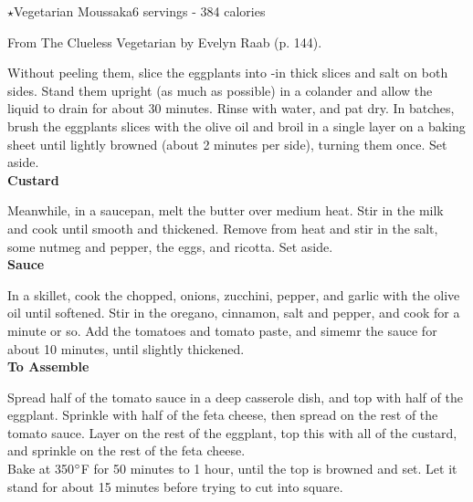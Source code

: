 \begin{recipe}{$\star$Vegetarian Moussaka}{6 servings - 384 calories}{}

\freeform From {\normalfont The Clueless Vegetarian} by Evelyn Raab (p. 144).


Without peeling them, slice the eggplants into -in thick slices and salt on both sides. Stand them upright (as much as possible) in a colander and allow the liquid to drain for about 30 minutes. Rinse with water, and pat dry. In batches, brush the eggplants slices with the olive oil and broil in a single layer on a baking sheet until lightly browned (about 2 minutes per side), turning them once. Set aside.\\

\textbf{Custard}

Meanwhile, in a saucepan, melt the butter over medium heat. Stir in the milk and cook until smooth and thickened. Remove from heat and stir in the salt, some nutmeg and pepper, the eggs, and ricotta. Set aside.\\

\textbf{Sauce}

In a skillet, cook the chopped, onions, zucchini, pepper, and garlic with the olive oil until softened. Stir in the oregano, cinnamon, salt and pepper, and cook for a minute or so. Add the tomatoes and tomato paste, and simemr the sauce for about 10 minutes, until slightly thickened.\\

\textbf{To Assemble}

Spread half of the tomato sauce in a deep casserole dish, and top with half of the eggplant. Sprinkle with half of the feta cheese, then spread on the rest of the tomato sauce. Layer on the rest of the eggplant, top this with all of the custard, and sprinkle on the rest of the feta cheese.\\

Bake at 350$\degree$F for 50 minutes to 1 hour, until the top is browned and set. Let it stand for about 15 minutes before trying to cut into square.

\end{recipe}